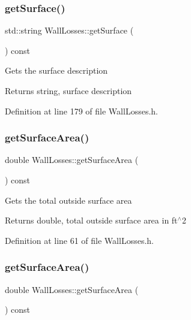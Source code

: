 \subsubsection{\texorpdfstring{get\+Surface()}{getSurface()}\hspace{0.1cm}{\footnotesize\ttfamily [3/3]}}
{\footnotesize\ttfamily std\+::string Wall\+Losses\+::get\+Surface (\begin{DoxyParamCaption}{ }\end{DoxyParamCaption}) const\hspace{0.3cm}{\ttfamily [inline]}}

Gets the surface description \begin{DoxyReturn}{Returns}
string, surface description 
\end{DoxyReturn}


Definition at line 179 of file Wall\+Losses.\+h.

\mbox{\label{class_wall_losses_ad4d3aa549cc7ab19e927823dbafed973}} 
\subsubsection{\texorpdfstring{get\+Surface\+Area()}{getSurfaceArea()}\hspace{0.1cm}{\footnotesize\ttfamily [1/3]}}
{\footnotesize\ttfamily double Wall\+Losses\+::get\+Surface\+Area (\begin{DoxyParamCaption}{ }\end{DoxyParamCaption}) const\hspace{0.3cm}{\ttfamily [inline]}}

Gets the total outside surface area \begin{DoxyReturn}{Returns}
double, total outside surface area in ft$^\wedge$2 
\end{DoxyReturn}


Definition at line 61 of file Wall\+Losses.\+h.

\mbox{\label{class_wall_losses_ad4d3aa549cc7ab19e927823dbafed973}} 
\subsubsection{\texorpdfstring{get\+Surface\+Area()}{getSurfaceArea()}\hspace{0.1cm}{\footnotesize\ttfamily [2/3]}}
{\footnotesize\ttfamily double Wall\+Losses\+::get\+Surface\+Area (\begin{DoxyParamCaption}{ }\end{DoxyParamCaption}) const\hspace{0.3cm}{\ttfamily [inline]}}

